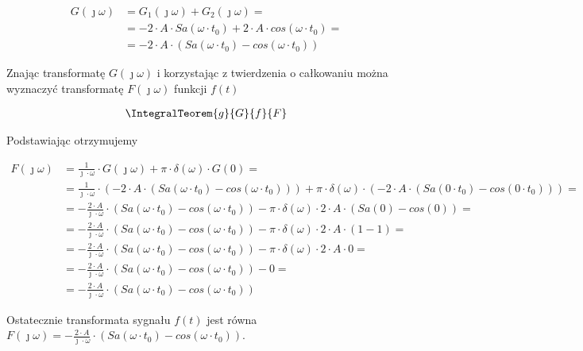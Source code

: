 \begin{task}
\begin{align*}
G(\jmath \omega) &= G_1(\jmath \omega)+G_2(\jmath \omega)=\\
&= -2\cdot A \cdot Sa\left( \omega \cdot t_0\right) + 2 \cdot A \cdot cos\left( \omega \cdot t_0\right)=\\
&= -2\cdot A \cdot \left( Sa\left( \omega \cdot t_0\right) - cos\left( \omega \cdot t_0\right) \right)
\end{align*}

Znając transformatę $G(\jmath \omega)$ i korzystając z twierdzenia o całkowaniu można wyznaczyć transformatę $F(\jmath \omega)$ funkcji $f(t)$

\begin{align*}
\IntegralTeorem{g}{G}{f}{F}
\end{align*}
 
 Podstawiając otrzymujemy
 
\begin{align*}
F(\jmath \omega) &= \frac{1}{\jmath \cdot \omega} \cdot G(\jmath \omega) + \pi \cdot \delta(\omega) \cdot G(0)=\\
&=\frac{1}{\jmath \cdot \omega} \cdot \left(-2\cdot A \cdot \left( Sa\left( \omega \cdot t_0\right) - cos\left( \omega \cdot t_0\right) \right)\right) + \pi \cdot \delta(\omega) \cdot \left( -2\cdot A \cdot \left( Sa\left( 0 \cdot t_0\right) - cos\left( 0 \cdot t_0\right) \right) \right)=\\
&=-\frac{2\cdot A}{\jmath \cdot \omega} \cdot \left( Sa\left( \omega \cdot t_0\right) - cos\left( \omega \cdot t_0\right) \right) - \pi \cdot \delta(\omega) \cdot 2\cdot A \cdot \left( Sa\left(0\right) - cos\left( 0 \right) \right)=\\
&=-\frac{2\cdot A}{\jmath \cdot \omega} \cdot \left( Sa\left( \omega \cdot t_0\right) - cos\left( \omega \cdot t_0\right) \right) - \pi \cdot \delta(\omega) \cdot 2\cdot A \cdot \left( 1 - 1 \right)=\\
&=-\frac{2\cdot A}{\jmath \cdot \omega} \cdot \left( Sa\left( \omega \cdot t_0\right) - cos\left( \omega \cdot t_0\right) \right) - \pi \cdot \delta(\omega) \cdot 2\cdot A \cdot 0=\\
&=-\frac{2\cdot A}{\jmath \cdot \omega} \cdot \left( Sa\left( \omega \cdot t_0\right) - cos\left( \omega \cdot t_0\right) \right) - 0 =\\
&=-\frac{2\cdot A}{\jmath \cdot \omega} \cdot \left( Sa\left( \omega \cdot t_0\right) - cos\left( \omega \cdot t_0\right) \right)
\end{align*}


Ostatecznie transformata sygnału $f(t)$ jest równa $F(\jmath \omega)=-\frac{2\cdot A}{\jmath \cdot \omega} \cdot \left( Sa\left( \omega \cdot t_0\right) - cos\left( \omega \cdot t_0\right) \right)$.

\end{task}

